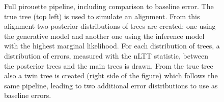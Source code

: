 \begin{figure}[H]
{
  }
  \caption{
    Full pirouette pipeline, including comparison to baseline error. 
    The true tree (top left) is used to simulate an alignment. 
    From this alignment two posterior distributions of trees are created: 
    one using the generative model and another one using the inference model with the highest marginal likelihood. For each distribution of trees, a distribution of errors, measured with the nLTT statistic, between the posterior trees and the main trees is drawn. From the true tree also a twin tree is created (right side of the figure) which follows the same pipeline, leading to two additional error distributions to use as baseline errors.
  }
  \label{fig:example_30_full_pipeline}
\end{figure}

